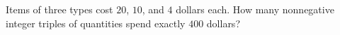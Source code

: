 Items of three types cost $20$, $10$, and $4$ dollars each. How many nonnegative integer triples of quantities spend exactly $400$ dollars?
